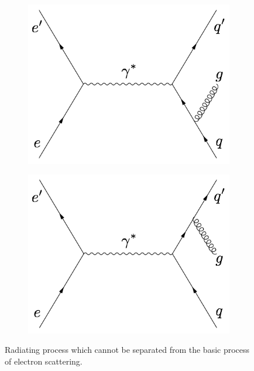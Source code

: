 \begin{figure}[tb!]
  \centering
  \begin{subfigure}[t]{0.35\textwidth}
    \includegraphics[width=\textwidth]{figs/gluon-radiation-a.png}
  \end{subfigure}
  \begin{subfigure}[t]{0.35\textwidth}
    \includegraphics[width=\textwidth]{figs/gluon-radiation-b.png}
  \end{subfigure}
  \caption[Gluon radiation in electron-quark scattering.]{Radiating process which cannot be separated from the basic process of electron scattering. \label{C2S3F1}}
\end{figure}

